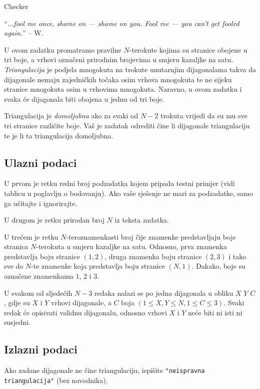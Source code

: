 \begin{statement}[
  problempoints=110,
  timelimit=1 sekund1,
  memorylimit=512 MiB,
]{Checker}

``\textit{...fool me once, shame on — shame on you. Fool me — you can't get fooled again.}''
-- W.

U ovom zadatku promatramo pravilne $N$-terokute kojima su stranice obojene u
tri boje, a vrhovi označeni prirodnim brojevima u smjeru kazaljke na satu.
\textit{Triangulacija} je podjela mnogokuta na trokute unutarnjim
dijagonalama takva da dijagonale nemaju zajedničkih točaka osim vrhova
mnogokuta te ne sijeku stranice mnogokuta osim u vrhovima mnogokuta.
Naravno, u ovom zadatku i svaka će dijagonala biti obojena u jednu od tri
boje.

Triangulacija je \textit{domoljubna} ako za svaki od $N-2$ trokuta vrijedi da
su mu sve tri stranice različite boje. Vaš je zadatak odrediti čine li
dijagonale triangulaciju te je li ta triangulacija domoljubna.

\subsection*{Ulazni podaci}
U prvom je retku redni broj podzadatka kojem pripada testni primjer
(vidi tablicu u poglavlju o bodovanju). Ako vaše rješenje ne mari za podzadatke,
samo ga učitajte i ignorirajte.

U drugom je retku prirodan broj $N$ iz teksta zadatka.

U trećem je retku $N$-teroznamenkasti broj čije znamenke predstavljaju boje
stranica $N$-terokuta u smjeru kazaljke na satu. Odnosno, prva znamenka
predstavlja boju stranice $(1,2)$, druga znamenka boju stranice $(2,3)$ i tako
sve do $N$-te znamenke koja predstavlja boju stranice $(N, 1)$. Dakako, boje su
označene znamenkama $1$, $2$ i $3$.

U svakom od sljedećih $N-3$ redaka nalazi se po jedna dijagonala u obliku
$X$ $Y$ $C$, gdje su $X$ i $Y$ vrhovi dijagonale, a $C$ boja
$(1 \le X, Y \le N, 1 \le C \le 3)$. Svaki redak će opisivati validnu
dijagonalu, odnosno vrhovi $X$ i $Y$ neće biti ni isti ni susjedni.

\subsection*{Izlazni podaci}
Ako zadane dijagonale ne čine triangulaciju, ispišite
\texttt{"neispravna triangulacija"} (bez navodnika).


\end{statement}
